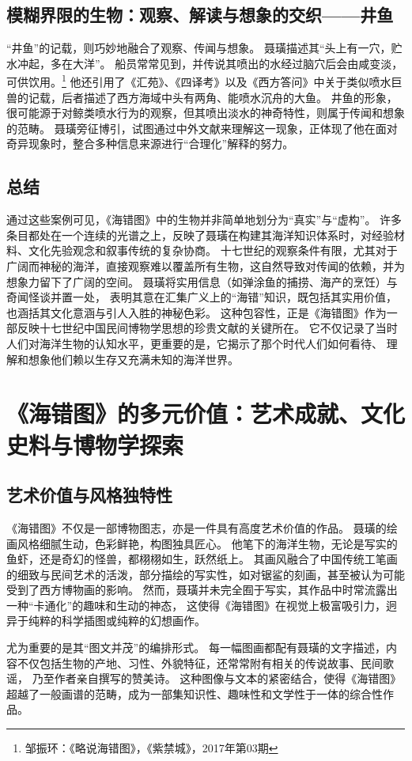 \documentclass{source/Paper}
\begin{document}
\subsection{模糊界限的生物：观察、解读与想象的交织——井鱼}
“井鱼”的记载，则巧妙地融合了观察、传闻与想象。
聂璜描述其“头上有一穴，贮水冲起，多在大洋”。
船员常常见到，并传说其喷出的水经过脑穴后会由咸变淡，可供饮用。\footnote{邹振环：《略说海错图》，《紫禁城》，2017年第03期}
他还引用了《汇苑》、《四译考》以及《西方答问》中关于类似喷水巨兽的记载，后者描述了西方海域中头有两角、能喷水沉舟的大鱼。
井鱼的形象，很可能源于对鲸类喷水行为的观察，但其喷出淡水的神奇特性，则属于传闻和想象的范畴。
聂璜旁征博引，试图通过中外文献来理解这一现象，正体现了他在面对奇异现象时，整合多种信息来源进行“合理化”解释的努力。
\subsection{总结}
通过这些案例可见，《海错图》中的生物并非简单地划分为“真实”与“虚构”。
许多条目都处在一个连续的光谱之上，反映了聂璜在构建其海洋知识体系时，对经验材料、文化先验观念和叙事传统的复杂协商。
十七世纪的观察条件有限，尤其对于广阔而神秘的海洋，直接观察难以覆盖所有生物，这自然导致对传闻的依赖，并为想象力留下了广阔的空间。
聂璜将实用信息（如弹涂鱼的捕捞、海产的烹饪）与奇闻怪谈并置一处，
表明其意在汇集广义上的“海错”知识，既包括其实用价值，
也涵括其文化意涵与引人入胜的神秘色彩。
这种包容性，正是《海错图》作为一部反映十七世纪中国民间博物学思想的珍贵文献的关键所在。
它不仅记录了当时人们对海洋生物的认知水平，更重要的是，它揭示了那个时代人们如何看待、
理解和想象他们赖以生存又充满未知的海洋世界。
\section{《海错图》的多元价值：艺术成就、文化史料与博物学探索}
\subsection{艺术价值与风格独特性}
《海错图》不仅是一部博物图志，亦是一件具有高度艺术价值的作品。
聂璜的绘画风格细腻生动，色彩鲜艳，构图独具匠心。
他笔下的海洋生物，无论是写实的鱼虾，还是奇幻的怪兽，都栩栩如生，跃然纸上。
其画风融合了中国传统工笔画的细致与民间艺术的活泼，部分描绘的写实性，如对锯鲨的刻画，甚至被认为可能受到了西方博物画的影响。
然而，聂璜并未完全囿于写实，其作品中时常流露出一种“卡通化”的趣味和生动的神态，
这使得《海错图》在视觉上极富吸引力，迥异于纯粹的科学插图或纯粹的幻想画作。

尤为重要的是其“图文并茂”的编排形式。
每一幅图画都配有聂璜的文字描述，内容不仅包括生物的产地、习性、外貌特征，还常常附有相关的传说故事、民间歌谣，
乃至作者亲自撰写的赞美诗。
这种图像与文本的紧密结合，使得《海错图》超越了一般画谱的范畴，成为一部集知识性、趣味性和文学性于一体的综合性作品。
\end{document}
